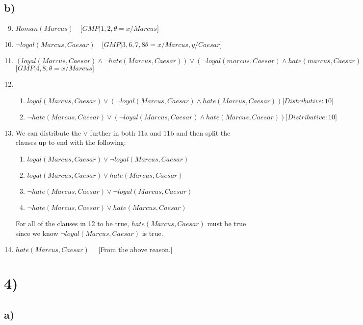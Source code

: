 \documentclass[22pt]{article}
\begin{document}
\subsection*{b)}

\begin{enumerate}
	\setcounter{enumi}{8}
	\item $ Roman(Marcus) \quad \big[GMP | 1, 2, \theta={x/Marcus} \big] $
	\item $ \neg loyal(Marcus, Caesar) \quad \big[GMP | 3, 6, 7, 8 \theta={x/Marcus, y/Caesar}\big] $
	\item $ (loyal(Marcus, Caesar) \land \neg hate(Marcus, Caesar)) \lor 
		(\neg loyal(marcus, Caesar) \land hate(marcus, Caesar)) $ \\ $ \big[GMP | 4, 8, \theta={x/Marcus}\big] $
	\item
	\begin{enumerate}
		\item $ loyal(Marcus, Caesar) \lor (\neg loyal(Marcus, Caesar) \land hate(Marcus, Caesar)) \big[Distributive: 10\big] $
		\item $ \neg hate(Marcus, Caesar) \lor (\neg loyal(Marcus, Caesar) \land hate(Marcus, Caesar)) \big[Distributive: 10\big] $
	\end{enumerate}
	\item We can distribute the $\lor$ further in both 11a and 11b and then split the clauses up to end with the following:
	\begin{enumerate}
		\item $ loyal(Marcus, Caesar) \lor \neg loyal(Marcus, Caesar) $
		\item $ loyal(Marcus, Caesar) \lor hate(Marcus, Caesar) $
		\item $ \neg hate(Marcus, Caesar) \lor \neg loyal(Marcus, Caesar) $
		\item $ \neg hate(Marcus, Caesar) \lor hate(Marcus, Caesar) $
	\end{enumerate}

	\noindent For all of the clauses in 12 to be true, $hate(Marcus, Caesar)$ must be true since we know $\neg loyal(Marcus, Caesar)$ is true.

	\item $hate(Marcus, Caesar) \quad$ [From the above reason.]  
\end{enumerate}

\section*{4)}
\subsection*{a)}
\end{document}
